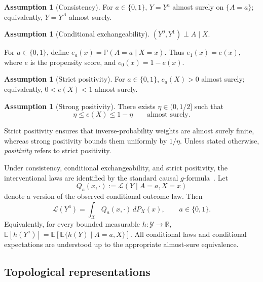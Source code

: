 \documentclass[11pt,a4paper]{article}
\theoremstyle{plain}
\theoremstyle{definition}
\newtheorem{assumption}[theorem]{Assumption}
\theoremstyle{remark}
\newcommand{\1}{\mathbbm{1}}
\begin{document}
\begin{assumption}[Consistency]
\label{ass:consistency}
For \(a\in\{0,1\}\), \(Y=Y^a\) almost surely on \(\{A=a\}\);
equivalently, \(Y=Y^A\) almost surely.
\end{assumption}

\begin{assumption}[Conditional exchangeability]
\label{ass:exchangeability}
\((Y^0,Y^1)\perp A\mid X\).
\end{assumption}

For \(a\in\{0,1\}\), define \(e_a(x)=\mathbb P(A=a\mid X=x)\). Thus \(e_1(x)=e(x)\), where \(e\) is the propensity score, and \(e_0(x)=1-e(x)\).

\begin{assumption}[Strict positivity]
\label{ass:positivity-strict}
For \(a\in\{0,1\}\), \(e_a(X)>0\) almost surely; equivalently,
\(0<e(X)<1\) almost surely.
\end{assumption}

\begin{assumption}[Strong positivity]
\label{ass:positivity-uniform}
There exists \(\eta\in(0,1/2]\) such that
\[
\eta\leq e(X)\leq1-\eta
\qquad\text{almost surely}.
\]
\end{assumption}

Strict positivity ensures that inverse-probability weights are almost surely finite, whereas strong positivity bounds them uniformly by \(1/\eta\). Unless stated otherwise, \emph{positivity} refers to strict positivity.

Under consistency, conditional exchangeability, and strict positivity, the interventional laws are identified by the standard causal \(g\)-formula~\citep{robins1986,hernanrobins2020}. Let
\[
Q_a(x,\cdot)
:=
\mathcal L(Y\mid A=a,X=x)
\]
denote a version of the observed conditional outcome law. Then
\[
\mathcal L(Y^a)
=
\int_{\mathcal X}Q_a(x,\cdot)\,dP_X(x),
\qquad a\in\{0,1\}.
\]
Equivalently, for every bounded measurable
\(h:\mathcal Y\to\mathbb R\),
\(\mathbb E[h(Y^a)] = \mathbb E\!\left[
\mathbb E\{h(Y)\mid A=a,X\}
\right]\). All conditional laws and conditional expectations are understood up to the appropriate almost-sure equivalence.



\subsection{Topological representations}
\label{subsec:topological-representations}
\end{document}
